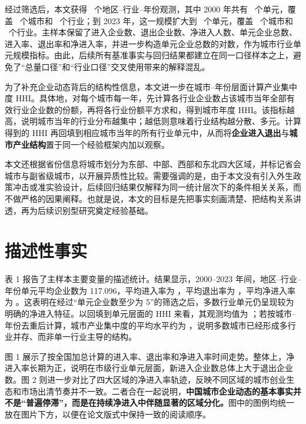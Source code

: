 \documentclass[12pt]{article}
\begin{document}
经过筛选后，本文获得 \SampleObs\ 个地区--行业--年份观测，其中 2000 年共有 \ObsYTwoThousand\ 个单元，覆盖 \CitiesYTwoThousand\ 个城市和 \IndustriesYTwoThousand\ 个行业；到 2023 年，这一规模扩大到 \ObsYTwentyThree\ 个单元，覆盖 \CitiesYTwentyThree\ 个城市和 \IndustriesYTwentyThree\ 个行业。主样本保留了进入企业数、退出企业数、净进入人数、单元企业总数、进入率、退出率和净进入率，并进一步构造单元企业总数的对数，作为城市行业单元规模指标。由此，后续所有基准事实与回归结果都建立在同一口径样本之上，避免了“总量口径”和“行业口径”交叉使用带来的解释混乱。

为了补充企业动态背后的结构性信息，本文进一步在城市--年份层面计算产业集中度 HHI。具体地，对每个城市每一年，先计算各行业企业数占该城市当年全部有效行业企业数的份额，再将各行业份额平方求和，得到城市年度 HHI。该指标越高，说明城市当年的行业分布越集中；越低则意味着行业结构越分散、多元。计算得到的 HHI 再回填到相应城市当年的所有行业单元中，从而将\textbf{企业进入退出}与\textbf{城市产业结构}置于同一个经验框架内加以观察。

本文还根据省份信息将城市划分为东部、中部、西部和东北四大区域，并标记省会城市与副省级城市，以开展异质性比较。需要强调的是，由于本文没有引入外生政策冲击或准实验设计，后续回归结果仅解释为同一统计层次下的条件相关关系，而不做严格的因果阐释。也就是说，本文的目标是先把事实刻画清楚、把结构关系讲透，再为后续识别型研究奠定经验基础。

\section{描述性事实}
表 1 报告了主样本主要变量的描述统计。结果显示，2000--2023 年间，地区--行业--年份单元平均企业数为 117.096，平均进入率为 \MeanEntryRate，平均退出率为 \MeanExitRate，平均净进入率为 \MeanNetRate。这表明在经过“单元企业数至少为 5”的筛选之后，多数行业单元仍呈现较为明确的净进入特征。以回填到单元层面的 HHI 来看，其观测均值为 \MeanHHI；若按城市--年份去重后计算，城市产业集中度的平均水平约为 \MeanCityHHI，说明多数城市已经形成多行业并存、而非单一行业主导的结构。



图 1 展示了按全国加总计算的进入率、退出率和净进入率时间走势。整体上，净进入率长期为正，说明在市级行业单元层面，新进入企业数总体上大于退出企业数。图 2 则进一步对比了四大区域的净进入率轨迹，反映不同区域的城市创业生态和市场出清节奏并不一致。二者合在一起说明，\textbf{中国城市企业动态的基本事实并不是“普遍停滞”，而是在持续净进入中伴随显著的区域分化。}图中的图例均统一放在图片下方，以便在论文版式中保持一致的阅读顺序。
\end{document}
